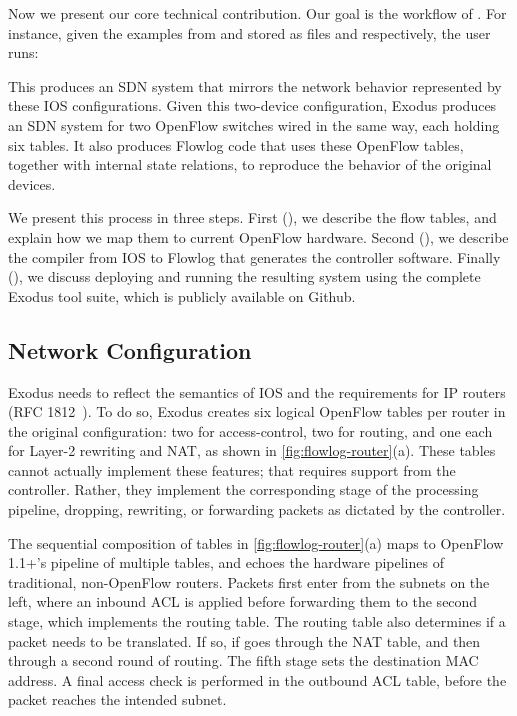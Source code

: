 Now we present our core technical contribution. Our goal is the
workflow of . For instance, given the examples from 
 and 
stored as files  and  respectively, the
user runs:

{\centering {}}

\noindent
This produces an SDN system that mirrors the network behavior
represented by these IOS configurations. Given this two-device
configuration, Exodus produces an SDN system for two OpenFlow switches
wired in the same way, each holding six tables. It also
produces Flowlog code that uses these OpenFlow tables, together with
internal state relations, to reproduce the behavior of the original
devices.

We present this process in three steps. First (), we
describe the flow tables, and explain how we map them to
current OpenFlow hardware. Second (), we describe
the compiler from IOS to Flowlog that generates the controller
software. Finally (), we discuss
deploying and running the resulting system using the
complete Exodus tool suite, which is publicly available on Github.

\subsection{Network Configuration}
\label{sec:net-conf}

Exodus needs to reflect the semantics of IOS and the requirements for
IP routers (RFC 1812~\cite{rfc1812}). To do so, Exodus creates six logical
OpenFlow tables per router in the original configuration: two for access-control, two for routing, and one each
for Layer-2 rewriting and NAT, as shown in \autoref{fig:flowlog-router}(a).
These tables cannot actually implement these features;
that requires support from the controller. Rather, they implement the
corresponding stage of the processing pipeline,
dropping, rewriting, or forwarding packets as dictated by the controller.

The sequential composition of tables in \autoref{fig:flowlog-router}(a)
maps to OpenFlow 1.1+'s pipeline of multiple tables, and echoes the
hardware pipelines of traditional, non-OpenFlow routers.  Packets
first enter from the subnets on the left, where an inbound ACL is
applied before forwarding them to the second stage, which implements
the routing table.  The routing table also determines if a packet
needs to be translated. If so, if goes through the NAT table, and then
through a second round of routing. The fifth stage sets the
destination MAC address. A final access check is performed in the
outbound ACL table, before the packet reaches the intended subnet.

